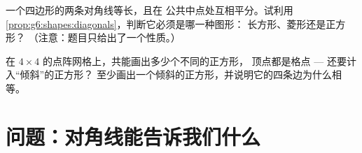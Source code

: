 \begin{exercise}[$\star\star$]\label{exo:g6:shapes:11}
一个四边形的两条对角线等长，且在
公共中点处互相平分。试利用\cref{prop:g6:shapes:diagonals}，判断它必须是哪一种图形：
长方形、菱形还是正方形？
（注意：题目只给出了一个性质。）
\end{exercise}

\begin{exercise}[$\star\star\star$]\label{exo:g6:shapes:12}
在 $4 \times 4$ 的点阵网格上，共能画出多少个不同的正方形，
顶点都是格点 --- 还要计入“倾斜”的正方形？
至少画出一个倾斜的正方形，并说明它的四条边为什么相等。
\end{exercise}

\section{问题：对角线能告诉我们什么}

